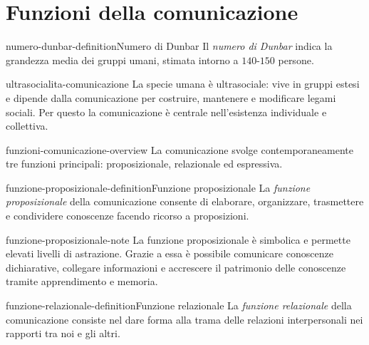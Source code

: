 \documentclass[preview]{standalone}
\begin{document}
\genpage

\section{Funzioni della comunicazione}

\begin{snippetdefinition}{numero-dunbar-definition}{Numero di Dunbar}
    Il \emph{numero di Dunbar} indica la grandezza media dei gruppi umani,
    stimata intorno a \(140\)-\(150\) persone.
\end{snippetdefinition}

\begin{snippet}{ultrasocialita-comunicazione}
    La specie umana è ultrasociale: vive in gruppi estesi e dipende dalla
    comunicazione per costruire, mantenere e modificare legami sociali. Per
    questo la comunicazione è centrale nell'esistenza individuale e collettiva.
\end{snippet}

\begin{snippet}{funzioni-comunicazione-overview}
    La comunicazione svolge contemporaneamente tre funzioni principali:
    proposizionale, relazionale ed espressiva.
\end{snippet}


\begin{snippetdefinition}{funzione-proposizionale-definition}{Funzione proposizionale}
    La \emph{funzione proposizionale} della comunicazione consente di elaborare,
    organizzare, trasmettere e condividere conoscenze facendo ricorso a
    proposizioni.
\end{snippetdefinition}

\begin{snippet}{funzione-proposizionale-note}
    La funzione proposizionale è simbolica e permette elevati livelli di
    astrazione. Grazie a essa è possibile comunicare conoscenze dichiarative,
    collegare informazioni e accrescere il patrimonio delle conoscenze tramite
    apprendimento e memoria.
\end{snippet}

\begin{snippetdefinition}{funzione-relazionale-definition}{Funzione relazionale}
    La \emph{funzione relazionale} della comunicazione consiste nel dare forma
    alla trama delle relazioni interpersonali nei rapporti tra noi e gli altri.
\end{snippetdefinition}
\end{document}
